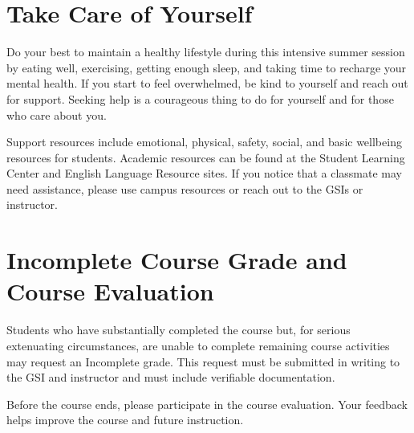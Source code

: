 \documentclass[11pt]{article}
\begin{document}
\section*{Take Care of Yourself} 

Do your best to maintain a healthy lifestyle during this intensive summer
session by eating well, exercising, getting enough sleep, and taking time to
recharge your mental health. If you start to feel overwhelmed, be kind to
yourself and reach out for support. Seeking help is a courageous thing to do
for yourself and for those who care about you.

Support resources include emotional, physical, safety, social, and basic
wellbeing resources for students. Academic resources can be found at the
Student Learning Center and English Language Resource sites. If you notice that
a classmate may need assistance, please use campus resources or reach out to
the GSIs or instructor.

\section*{Incomplete Course Grade and Course Evaluation}

Students who have substantially completed the course but, for serious
extenuating circumstances, are unable to complete remaining course activities
may request an Incomplete grade. This request must be submitted in writing to
the GSI and instructor and must include verifiable documentation.

Before the course ends, please participate in the course evaluation. Your
feedback helps improve the course and future instruction.
\end{document}

